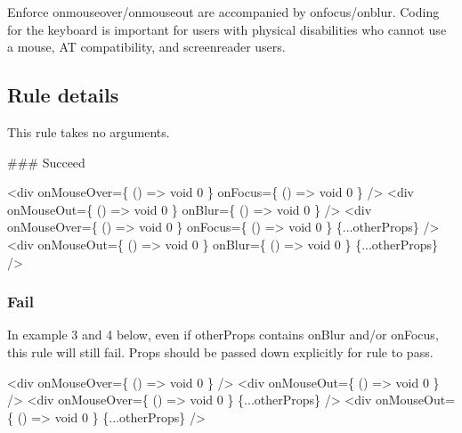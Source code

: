 Enforce onmouseover/onmouseout are accompanied by onfocus/onblur. Coding for the keyboard is important for users with physical disabilities who cannot use a mouse, AT compatibility, and screenreader users.

\subsection*{Rule details}

This rule takes no arguments.

\#\#\# Succeed 
\begin{DoxyCode}
<div onMouseOver=\{ () => void 0 \} onFocus=\{ () => void 0 \} />
<div onMouseOut=\{ () => void 0 \} onBlur=\{ () => void 0 \} />
<div onMouseOver=\{ () => void 0 \} onFocus=\{ () => void 0 \} \{...otherProps\} />
<div onMouseOut=\{ () => void 0 \} onBlur=\{ () => void 0 \} \{...otherProps\} />
\end{DoxyCode}


\subsubsection*{Fail}

In example 3 and 4 below, even if other\+Props contains on\+Blur and/or on\+Focus, this rule will still fail. Props should be passed down explicitly for rule to pass.


\begin{DoxyCode}
<div onMouseOver=\{ () => void 0 \} />
<div onMouseOut=\{ () => void 0 \} />
<div onMouseOver=\{ () => void 0 \} \{...otherProps\} />
<div onMouseOut=\{ () => void 0 \} \{...otherProps\} />
\end{DoxyCode}
 